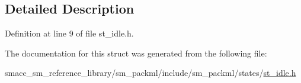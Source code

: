 \subsection{Detailed Description}


Definition at line 9 of file st\+\_\+idle.\+h.



The documentation for this struct was generated from the following file\+:\begin{DoxyCompactItemize}
\item 
smacc\+\_\+sm\+\_\+reference\+\_\+library/sm\+\_\+packml/include/sm\+\_\+packml/states/\hyperlink{st__idle_8h}{st\+\_\+idle.\+h}\end{DoxyCompactItemize}
